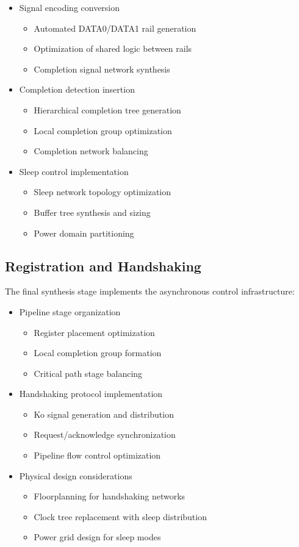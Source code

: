 \documentclass[conference]{IEEEtran}
\begin{document}
\begin{itemize}
\item Signal encoding conversion
  \begin{itemize}
  \item Automated DATA0/DATA1 rail generation
  \item Optimization of shared logic between rails
  \item Completion signal network synthesis
  \end{itemize}
\item Completion detection insertion
  \begin{itemize}
  \item Hierarchical completion tree generation
  \item Local completion group optimization
  \item Completion network balancing
  \end{itemize}
\item Sleep control implementation
  \begin{itemize}
  \item Sleep network topology optimization
  \item Buffer tree synthesis and sizing
  \item Power domain partitioning
  \end{itemize}
\end{itemize}

\subsection{Registration and Handshaking}
The final synthesis stage implements the asynchronous control infrastructure:

\begin{itemize}
\item Pipeline stage organization
  \begin{itemize}
  \item Register placement optimization
  \item Local completion group formation
  \item Critical path stage balancing
  \end{itemize}
\item Handshaking protocol implementation
  \begin{itemize}
  \item Ko signal generation and distribution
  \item Request/acknowledge synchronization
  \item Pipeline flow control optimization
  \end{itemize}
\item Physical design considerations
  \begin{itemize}
  \item Floorplanning for handshaking networks
  \item Clock tree replacement with sleep distribution
  \item Power grid design for sleep modes
  \end{itemize}
\end{itemize}
\end{document}
